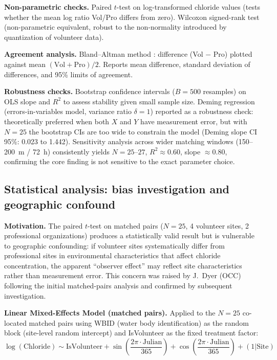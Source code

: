 \documentclass[lineno]{wlpeerj}
\begin{document}
\textbf{Non-parametric checks.} Paired $t$-test on log-transformed chloride values (tests whether the mean log ratio Vol/Pro differs from zero). Wilcoxon signed-rank test (non-parametric equivalent, robust to the non-normality introduced by quantization of volunteer data).

\textbf{Agreement analysis.} Bland--Altman method \citep{BlandAltman1986}: difference (Vol $-$ Pro) plotted against mean $(\mathrm{Vol} + \mathrm{Pro})/2$. Reports mean difference, standard deviation of differences, and 95\% limits of agreement.

\textbf{Robustness checks.} Bootstrap confidence intervals ($B=500$ resamples) on OLS slope and $R^{2}$ to assess stability given small sample size. Deming regression (errors-in-variables model, variance ratio $\delta = 1$) reported as a robustness check: theoretically preferred when both $X$ and $Y$ have measurement error, but with $N=25$ the bootstrap CIs are too wide to constrain the model (Deming slope CI 95\%: 0.023 to 1.442). Sensitivity analysis across wider matching windows (150--200~m / 72~h) consistently yields $N = 25$--$27$, $R^{2} \approx 0.60$, slope $\approx 0.80$, confirming the core finding is not sensitive to the exact parameter choice.

\subsection{Statistical analysis: bias investigation and geographic confound}

\textbf{Motivation.} The paired $t$-test on matched pairs ($N=25$, 4 volunteer sites, 2 professional organizations) produces a statistically valid result but is vulnerable to geographic confounding: if volunteer sites systematically differ from professional sites in environmental characteristics that affect chloride concentration, the apparent ``observer effect'' may reflect site characteristics rather than measurement error. This concern was raised by J.\ Dyer (OCC) following the initial matched-pairs analysis and confirmed by subsequent investigation.

\textbf{Linear Mixed-Effects Model (matched pairs).} Applied to the $N=25$ co-located matched pairs using WBID (water body identification) as the random block (site-level random intercept) and IsVolunteer as the fixed treatment factor:
\begin{equation}
\log(\mathrm{Chloride}) \sim \mathrm{IsVolunteer} + \sin\!\left(\frac{2\pi \cdot \mathrm{Julian}}{365}\right) + \cos\!\left(\frac{2\pi \cdot \mathrm{Julian}}{365}\right) + (1|\mathrm{Site})
\label{eq:matchedlme}
\end{equation}
\end{document}
